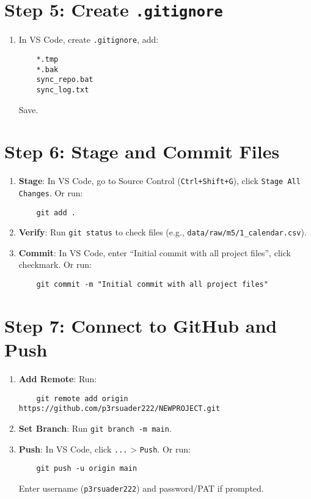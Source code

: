 \documentclass[a4paper,12pt]{article}
\begin{document}
\section{Step 5: Create \texttt{.gitignore}}
\begin{enumerate}[label=\arabic*.]
    \item In VS Code, create \texttt{.gitignore}, add:
    \begin{verbatim}
    *.tmp
    *.bak
    sync_repo.bat
    sync_log.txt
    \end{verbatim}
    Save.
\end{enumerate}

\section{Step 6: Stage and Commit Files}
\begin{enumerate}[label=\arabic*.]
    \item \textbf{Stage}: In VS Code, go to Source Control (\texttt{Ctrl+Shift+G}), click \texttt{Stage All Changes}. Or run:
    \begin{verbatim}
    git add .
    \end{verbatim}
    \item \textbf{Verify}: Run \texttt{git status} to check files (e.g., \texttt{data/raw/m5/1_calendar.csv}).
    \item \textbf{Commit}: In VS Code, enter ``Initial commit with all project files'', click checkmark. Or run:
    \begin{verbatim}
    git commit -m "Initial commit with all project files"
    \end{verbatim}
\end{enumerate}

\section{Step 7: Connect to GitHub and Push}
\begin{enumerate}[label=\arabic*.]
    \item \textbf{Add Remote}: Run:
    \begin{verbatim}
    git remote add origin https://github.com/p3rsuader222/NEWPROJECT.git
    \end{verbatim}
    \item \textbf{Set Branch}: Run \texttt{git branch -m main}.
    \item \textbf{Push}: In VS Code, click \texttt{...} > \texttt{Push}. Or run:
    \begin{verbatim}
    git push -u origin main
    \end{verbatim}
    Enter username (\texttt{p3rsuader222}) and password/PAT if prompted.
\end{enumerate}
\end{document}
